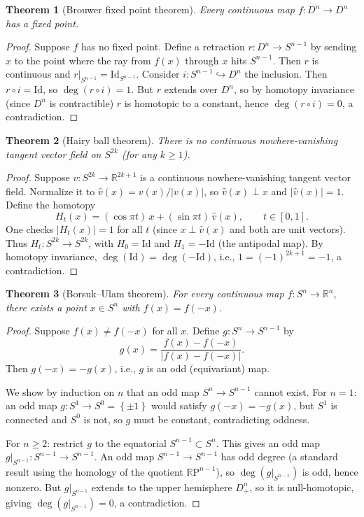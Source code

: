 \documentclass[12pt,a4paper,openany]{book}
\newtheorem{theorem}{Theorem}[section]
\theoremstyle{definition}
\theoremstyle{remark}
\newcommand{\R}{\mathbb{R}}
\newcommand{\RP}{\mathbb{R}\mathrm{P}}
\newcommand{\Id}{\mathrm{Id}}
\newcommand{\abs}[1]{\left\lvert #1 \right\rvert}
\newcommand{\set}[1]{\left\{ #1 \right\}}
\begin{document}
\begin{theorem}[Brouwer fixed point theorem]\label{thm:brouwer-degree}
Every continuous map $f\colon D^n \to D^n$ has a fixed point.
\end{theorem}

\begin{proof}
Suppose $f$ has no fixed point. Define a retraction $r\colon D^n \to S^{n-1}$
by sending $x$ to the point where the ray from $f(x)$ through $x$ hits
$S^{n-1}$. Then $r$ is continuous and $r|_{S^{n-1}} = \Id_{S^{n-1}}$.
Consider $i\colon S^{n-1}\hookrightarrow D^n$ the inclusion. Then
$r\circ i = \Id$, so $\deg(r\circ i) = 1$. But $r$ extends over $D^n$,
so by homotopy invariance (since $D^n$ is contractible)
$r$ is homotopic to a constant, hence $\deg(r\circ i) = 0$, a contradiction.
\end{proof}

\begin{theorem}[Hairy ball theorem]\label{thm:hairy-ball}
There is no continuous nowhere-vanishing tangent vector field on $S^{2k}$
(for any $k \ge 1$).
\end{theorem}

\begin{proof}
Suppose $v\colon S^{2k}\to \R^{2k+1}$ is a continuous nowhere-vanishing
tangent vector field. Normalize it to $\hat{v}(x) = v(x)/\abs{v(x)}$,
so $\hat{v}(x)\perp x$ and $\abs{\hat{v}(x)}=1$. Define the homotopy
\[
  H_t(x) = (\cos\pi t)\,x + (\sin\pi t)\,\hat{v}(x), \qquad t\in[0,1].
\]
One checks $\abs{H_t(x)} = 1$ for all $t$ (since $x \perp \hat{v}(x)$ and
both are unit vectors). Thus $H_t\colon S^{2k}\to S^{2k}$, with
$H_0 = \Id$ and $H_1 = -\Id$ (the antipodal map). By homotopy invariance,
$\deg(\Id) = \deg(-\Id)$, i.e., $1 = (-1)^{2k+1} = -1$, a contradiction.
\end{proof}

\begin{theorem}[Borsuk--Ulam theorem]\label{thm:borsuk-ulam}
For every continuous map $f\colon S^n \to \R^n$, there exists a
point $x \in S^n$ with $f(x) = f(-x)$.
\end{theorem}

\begin{proof}
Suppose $f(x) \neq f(-x)$ for all $x$. Define
$g\colon S^n \to S^{n-1}$ by
\[
  g(x) = \frac{f(x)-f(-x)}{\abs{f(x)-f(-x)}}.
\]
Then $g(-x) = -g(x)$, i.e., $g$ is an odd (equivariant) map.

We show by induction on $n$ that an odd map $S^n \to S^{n-1}$ cannot exist.
For $n=1$: an odd map $g\colon S^1 \to S^0 = \set{\pm 1}$ would satisfy
$g(-x)=-g(x)$, but $S^1$ is connected and $S^0$ is not, so $g$ must be
constant, contradicting oddness.

For $n \ge 2$: restrict $g$ to the equatorial $S^{n-1}\subset S^n$.
This gives an odd map $g|_{S^{n-1}}\colon S^{n-1}\to S^{n-1}$.
An odd map $S^{n-1}\to S^{n-1}$ has odd degree (a standard result
using the homology of the quotient $\RP^{n-1}$), so
$\deg(g|_{S^{n-1}})$ is odd, hence nonzero.
But $g|_{S^{n-1}}$ extends to the upper hemisphere $D^n_+$, so
it is null-homotopic, giving $\deg(g|_{S^{n-1}})=0$, a contradiction.
\end{proof}
\end{document}
